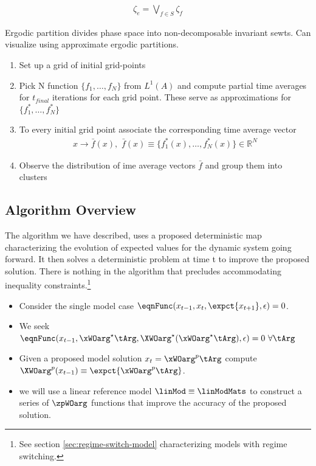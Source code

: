 \documentclass[12pt]{article}
\begin{document}
\begin{gather*}
  \zeta_e= \bigvee_{f\in S} \zeta_f
\end{gather*}

Ergodic partition divides phase space into non-decomposable invariant sewts.  Can visualize using approximate ergodic partitions.

\begin{enumerate}
\item Set up a grid of initial grid-points
\item Pick N function $\{f_1,\ldots,f_N\}$ from $L^1(A)$ and compute partial time averages for $t_{final}$ iterations for each grid point.  These serve as approximations for $\{f_1^\ast,\ldots,f_N^\ast\}$
\item To every initial grid point associate the corresponding time average vector
  \begin{gather*}
    x \rightarrow \bar{f}(x),\,\, \bar{f}(x)\equiv \{f_1^\ast(x),\ldots,f_N^\ast(x)\}\in \mathbb{R}^N
  \end{gather*}
\item Observe the distribution of ime average vectors $\bar{f}$ and group them into clusters
\end{enumerate}


\subsection{Algorithm Overview}

 \label{sec:unknown-solutions}
The algorithm we have described,
uses a proposed deterministic map
characterizing the evolution of expected values for
the dynamic system going forward. It then solves
a deterministic problem at time t to improve the proposed solution.
There is nothing in the algorithm that precludes accommodating  inequality
constraints.\footnote{See section \ref{sec:regime-switch-model} characterizing
  models with regime switching.}


{
  \begin{itemize}
  \item Consider the single model case $  \eqnFunc(x_{t-1},x_t,\expct{x_{t+1}},\epsilon)=0$.  
\item We seek $\eqnFunc(x_{t-1},\xWOarg^\star\tArg,\XWOarg^\star(\xWOarg^\star\tArg),\epsilon)=0\,\,\forall \tArg $
\item Given a proposed model solution $x_t=\xWOarg^p\tArg$ compute $\XWOarg^p(x_{t-1})\equiv \expct{\xWOarg^p\tArg}$. 
\item we will use a linear reference model $\linMod  \equiv \linModMats$ 
to construct a series of $\zpWOarg$ functions that improve the accuracy of the proposed solution.
\end{itemize}
}
\end{document}
